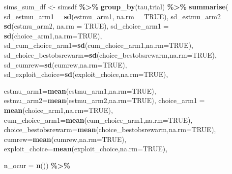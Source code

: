 \documentclass[
]{article}
\newenvironment{Shaded}{\begin{snugshade}}{\end{snugshade}}
\newcommand{\AttributeTok}[1]{\textcolor[rgb]{0.13,0.29,0.53}{#1}}
\newcommand{\ConstantTok}[1]{\textcolor[rgb]{0.56,0.35,0.01}{#1}}
\newcommand{\FunctionTok}[1]{\textcolor[rgb]{0.13,0.29,0.53}{\textbf{#1}}}
\newcommand{\NormalTok}[1]{#1}
\newcommand{\OtherTok}[1]{\textcolor[rgb]{0.56,0.35,0.01}{#1}}
\newcommand{\SpecialCharTok}[1]{\textcolor[rgb]{0.81,0.36,0.00}{\textbf{#1}}}
\begin{document}
\begin{Shaded}
\begin{Highlighting}[]
\NormalTok{  sims\_sum\_df }\OtherTok{\textless{}{-}}\NormalTok{ simsdf }\SpecialCharTok{\%\textgreater{}\%}
  \FunctionTok{group\_by}\NormalTok{(tau,trial) }\SpecialCharTok{\%\textgreater{}\%} 
  \FunctionTok{summarise}\NormalTok{(}
    \AttributeTok{sd\_estmu\_arm1 =} \FunctionTok{sd}\NormalTok{(estmu\_arm1, }\AttributeTok{na.rm =} \ConstantTok{TRUE}\NormalTok{),}
    \AttributeTok{sd\_estmu\_arm2 =} \FunctionTok{sd}\NormalTok{(estmu\_arm2, }\AttributeTok{na.rm =} \ConstantTok{TRUE}\NormalTok{),}
    \AttributeTok{sd\_choice\_arm1 =} \FunctionTok{sd}\NormalTok{(choice\_arm1,}\AttributeTok{na.rm=}\ConstantTok{TRUE}\NormalTok{),}
    \AttributeTok{sd\_cum\_choice\_arm1=}\FunctionTok{sd}\NormalTok{(cum\_choice\_arm1,}\AttributeTok{na.rm=}\ConstantTok{TRUE}\NormalTok{),}
    \AttributeTok{sd\_choice\_bestobsrewarm=}\FunctionTok{sd}\NormalTok{(choice\_bestobsrewarm,}\AttributeTok{na.rm=}\ConstantTok{TRUE}\NormalTok{),}
    \AttributeTok{sd\_cumrew=}\FunctionTok{sd}\NormalTok{(cumrew,}\AttributeTok{na.rm=}\ConstantTok{TRUE}\NormalTok{),}
    \AttributeTok{sd\_exploit\_choice=}\FunctionTok{sd}\NormalTok{(exploit\_choice,}\AttributeTok{na.rm=}\ConstantTok{TRUE}\NormalTok{),}
    
    \AttributeTok{estmu\_arm1=}\FunctionTok{mean}\NormalTok{(estmu\_arm1,}\AttributeTok{na.rm=}\ConstantTok{TRUE}\NormalTok{),}
            \AttributeTok{estmu\_arm2=}\FunctionTok{mean}\NormalTok{(estmu\_arm2,}\AttributeTok{na.rm=}\ConstantTok{TRUE}\NormalTok{),}
            \AttributeTok{choice\_arm1 =} \FunctionTok{mean}\NormalTok{(choice\_arm1,}\AttributeTok{na.rm=}\ConstantTok{TRUE}\NormalTok{),}
            \AttributeTok{cum\_choice\_arm1=}\FunctionTok{mean}\NormalTok{(cum\_choice\_arm1,}\AttributeTok{na.rm=}\ConstantTok{TRUE}\NormalTok{),}
            \AttributeTok{choice\_bestobsrewarm=}\FunctionTok{mean}\NormalTok{(choice\_bestobsrewarm,}\AttributeTok{na.rm=}\ConstantTok{TRUE}\NormalTok{),}
            \AttributeTok{cumrew=}\FunctionTok{mean}\NormalTok{(cumrew,}\AttributeTok{na.rm=}\ConstantTok{TRUE}\NormalTok{),}
            \AttributeTok{exploit\_choice=}\FunctionTok{mean}\NormalTok{(exploit\_choice,}\AttributeTok{na.rm=}\ConstantTok{TRUE}\NormalTok{),}
    
    \AttributeTok{n\_ocur =} \FunctionTok{n}\NormalTok{()) }\SpecialCharTok{\%\textgreater{}\%}
  

\end{Highlighting}
\end{Shaded}
\end{document}
